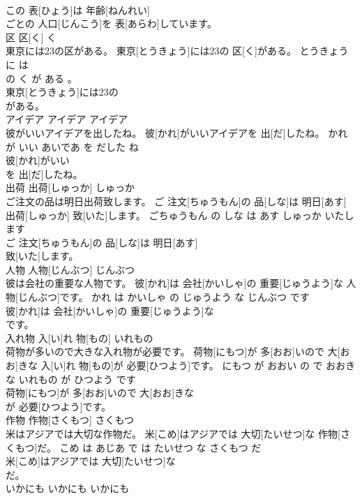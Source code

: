 \documentclass[8pt]{extreport}
\begin{document}
\begin{CJK}{UTF8}{min}
\\	この 表[ひょう]は 年齢[ねんれい]
\\	ごとの 人口[じんこう]を 表[あらわ]しています。			
\\	区	区[く]	く	
\\	東京には23の区がある。	東京[とうきょう]には23の 区[く]がある。	とうきょう に は 
\\	の く が ある 。	
\\	東京[とうきょう]には23の
\\	がある。			
\\	アイデア	アイデア	アイデア	
\\	彼がいいアイデアを出したね。	彼[かれ]がいいアイデアを 出[だ]したね。	かれ が いい あいであ を だした ね	
\\	彼[かれ]がいい
\\	を 出[だ]したね。			
\\	出荷	出荷[しゅっか]	しゅっか	
\\	ご注文の品は明日出荷致します。	ご 注文[ちゅうもん]の 品[しな]は 明日[あす] 出荷[しゅっか] 致[いた]します。	ごちゅうもん の しな は あす しゅっか いたします	
\\	ご 注文[ちゅうもん]の 品[しな]は 明日[あす]
\\	致[いた]します。			
\\	人物	人物[じんぶつ]	じんぶつ	
\\	彼は会社の重要な人物です。	彼[かれ]は 会社[かいしゃ]の 重要[じゅうよう]な 人物[じんぶつ]です。	かれ は かいしゃ の じゅうよう な じんぶつ です	
\\	彼[かれ]は 会社[かいしゃ]の 重要[じゅうよう]な
\\	です。			
\\	入れ物	入[い]れ 物[もの]	いれもの	
\\	荷物が多いので大きな入れ物が必要です。	荷物[にもつ]が 多[おお]いので 大[おお]きな 入[い]れ 物[もの]が 必要[ひつよう]です。	にもつ が おおい の で おおき な いれもの が ひつよう です	
\\	荷物[にもつ]が 多[おお]いので 大[おお]きな
\\	が 必要[ひつよう]です。			
\\	作物	作物[さくもつ]	さくもつ	
\\	米はアジアでは大切な作物だ。	米[こめ]はアジアでは 大切[たいせつ]な 作物[さくもつ]だ。	こめ は あじあ で は たいせつ な さくもつ だ	
\\	米[こめ]はアジアでは 大切[たいせつ]な
\\	だ。			
\\	いかにも	いかにも	いかにも	

\end{CJK}
\end{document}
